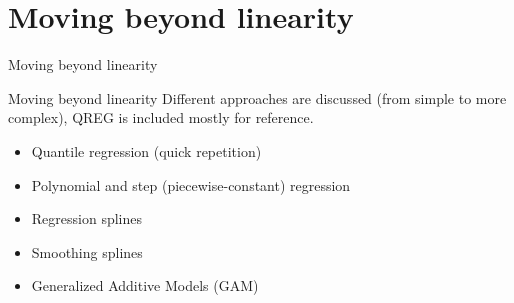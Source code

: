 \documentclass{beamer}
\begin{document}
\section{Moving beyond linearity}
\begin{frame}{Moving beyond linearity}
\end{frame}
\begin{frame}{Moving beyond linearity}
Different approaches are discussed (from simple to more complex), QREG is included mostly for reference.\\
\bigskip

\begin{itemize}
\item Quantile regression (quick repetition)
\smallskip
\item Polynomial and step (piecewise-constant) regression
\smallskip
\item Regression splines
\smallskip
\item Smoothing splines
\smallskip
\item Generalized Additive Models (GAM)
\end{itemize}
\end{frame}
\end{document}
